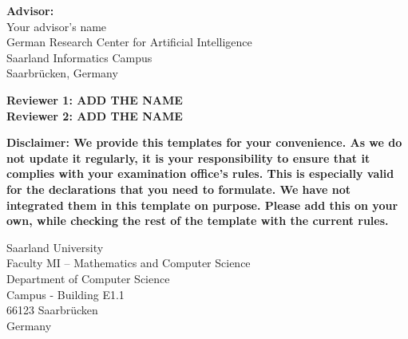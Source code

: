 \pagestyle{empty}

\vspace*{0.5cm}
\textbf{Advisor:}\\
Your advisor's name\\
German Research Center for Artificial Intelligence\\
Saarland Informatics Campus\\
Saarbrücken, Germany

\vspace*{2.5cm}
\textbf{\color{red}  Reviewer 1: ADD THE NAME}\\
\textbf{\color{red}  Reviewer 2: ADD THE NAME}\\


\vspace{4.5cm}

\textbf{\color{red}  Disclaimer: We provide this templates for your convenience. As we do not update it regularly, it is your responsibility to ensure that it complies with your examination office's rules. This is especially valid for the declarations that you need to formulate. We have not integrated them in this template on purpose. Please add this on your own, while checking the rest of the template with the current rules.}


\vspace{3cm}
Saarland University\\
Faculty MI – Mathematics and Computer Science\\
Department of Computer Science\\
Campus - Building E1.1\\
66123 Saarbrücken\\
Germany\\


